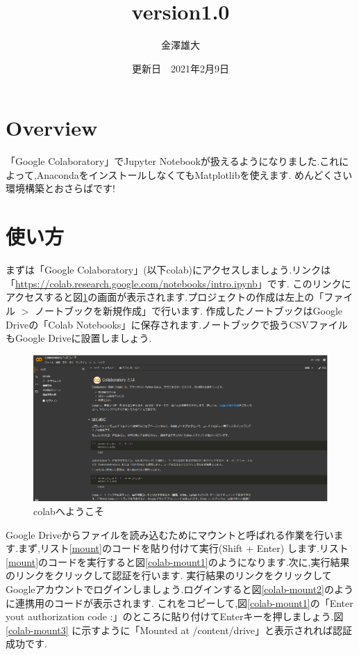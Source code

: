 \documentclass[a4j]{jarticle}
\title{version1.0}
\date{更新日　2021年2月9日}
\author{金澤雄大}
\begin{document}
    \maketitle
    \thispagestyle{empty}
    \clearpage
    \addtocounter{page}{-1}

    \section{Overview}
    「Google Colaboratory」でJupyter Notebookが扱えるようになりました.これによって,AnacondaをインストールしなくてもMatplotlibを使えます.
    めんどくさい環境構築とおさらばです!
    
    \section{使い方}

    まずは「Google Colaboratory」(以下colab)にアクセスしましょう.リンクは「\url{https://colab.research.google.com/notebooks/intro.ipynb}」です.
    このリンクにアクセスすると図\ref{colab-title}の画面が表示されます.プロジェクトの作成は左上の「ファイル $>$ ノートブックを新規作成」で行います.
    作成したノートブックはGoogle Driveの「Colab Notebooks」に保存されます.ノートブックで扱うCSVファイルもGoogle Driveに設置しましょう.

    \begin{figure}[H]
      \centering
      \includegraphics[scale=1.0]{colab-title.eps}
      \caption{colabへようこそ}
       \label{colab-title}
      \end{figure}

      Google Driveからファイルを読み込むためにマウントと呼ばれる作業を行います.まず,リスト\ref{mount}のコードを貼り付けて実行(Shift + Enter)
      します.リスト\ref{mount}のコードを実行すると図\ref{colab-mount1}のようになります.次に,実行結果のリンクをクリックして認証を行います.
      実行結果のリンクをクリックしてGoogleアカウントでログインしましょう.ログインすると図\ref{colab-mount2}のように連携用のコードが表示されます.
      これをコピーして,図\ref{colab-mount1}の「Enter yout authorization code :」のところに貼り付けてEnterキーを押しましょう.図\ref{colab-mount3}
      に示すように「Mounted at /content/drive」と表示されれば認証成功です.
\end{document}
